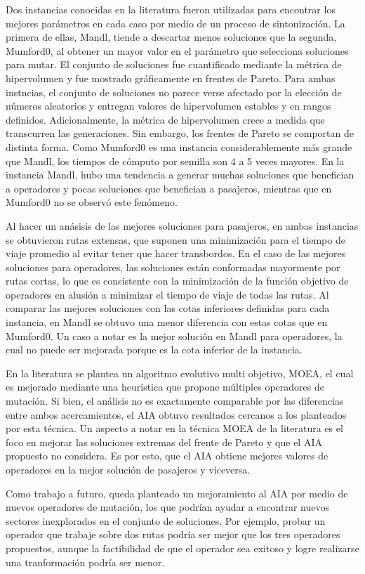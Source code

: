 Dos instancias conocidas en la literatura fueron utilizadas para encontrar los mejores parámetros en cada caso por medio de un proceso de sintonización. La primera de ellas, Mandl, tiende a descartar menos soluciones que la segunda, Mumford0, al obtener un mayor valor en el parámetro que selecciona soluciones para mutar. El conjunto de soluciones fue cuantificado mediante la métrica de hipervolumen y fue mostrado gráficamente en frentes de Pareto. Para ambas instncias, el conjunto de soluciones no parece verse afectado por la elección de números aleatorios y entregan valores de hipervolumen estables y en rangos definidos. Adicionalmente, la métrica de hipervolumen crece a medida que transcurren las generaciones. Sin embargo, los frentes de Pareto se comportan de distinta forma. Como Mumford0 es una instancia considerablemente más grande que Mandl, los tiempos de cómputo por semilla son 4 a 5 veces mayores. En la instancia Mandl, hubo una tendencia a generar muchas soluciones que benefician a operadores y pocas soluciones que benefician a pasajeros, mientras que en Mumford0 no se observó este fenómeno.

Al hacer un anásisis de las mejores soluciones para pasajeros, en ambas instancias se obtuvieron rutas extensas, que suponen una minimización para el tiempo de viaje promedio al evitar tener que hacer transbordos. En el caso de las mejores soluciones para operadores, las soluciones están conformadas mayormente por rutas cortas, lo que es consistente con la minimización de la función objetivo de operadores en alusión a minimizar el tiempo de viaje de todas las rutas. Al comparar las mejores soluciones con las cotas inferiores definidas para cada instancia, en Mandl se obtuvo una menor diferencia con estas cotas que en Mumford0. Un caso a notar es la mejor solución en Mandl para operadores, la cual no puede ser mejorada porque es la cota inferior de la instancia.

En la literatura se plantea un algoritmo evolutivo multi objetivo, MOEA, el cual es mejorado mediante una heurística que propone múltiples operadores de mutación. Si bien, el análisis no es exactamente comparable por las diferencias entre ambos acercamientos, el AIA obtuvo resultados cercanos a los planteados por esta técnica. Un aspecto a notar en la técnica MOEA de la literatura es el foco en mejorar las soluciones extremas del frente de Pareto y que el AIA propuesto no considera. Es por esto, que el AIA obtiene mejores valores de operadores en la mejor solución de pasajeros y viceversa.

Como trabajo a futuro, queda planteado un mejoramiento al AIA por medio de nuevos operadores de mutación, los que podrían ayudar a encontrar nuevos sectores inexplorados en el conjunto de soluciones. Por ejemplo, probar un operador que trabaje sobre dos rutas podría ser mejor que los tres operadores propuestos, aunque la factibilidad de que el operador sea exitoso y logre realizarse una tranformación podría ser menor.
